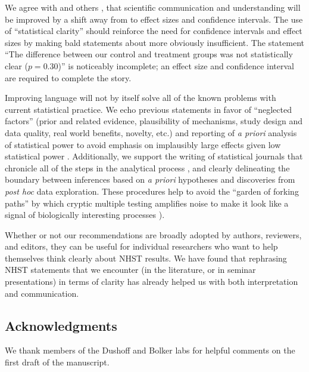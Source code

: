 We agree with \citet{Cohen1994} and others \citep{Goodman1999, ZiliakandMcCloskey2008, WassersteinandLazar2016}, that scientific communication and understanding will be improved by a shift away from \pvals to effect sizes and confidence intervals. The use of ``statistical clarity'' should reinforce the need for confidence intervals and effect sizes by making bald statements about \pvals more obviously insufficient. The statement ``The difference between our control and treatment groups was not statistically clear ($p = 0.30$)'' is noticeably incomplete; an effect size and confidence interval are required to complete the story.

Improving language will not by itself solve all of the known problems with current statistical practice. We echo previous statements in favor of ``neglected factors'' (prior and related evidence, plausibility of mechanisms, study design and data quality, real world benefits, novelty, etc.) \citep{McShaneetal.2017} and reporting of \emph{a priori} analysis of statistical power to avoid emphasis on implausibly large effects given low statistical power \citep[the ``winner's curse''][]{GelmanandCarlin2014, SzucsandIoannidis2017, Bernardietal.2017}. Additionally, we support the writing of statistical journals that chronicle all of the steps in the analytical process \citep{Kassetal.2016}, and clearly delineating the boundary between inferences based on \emph{a priori} hypotheses and discoveries from \emph{post hoc} data exploration. These procedures help to avoid the ``garden of forking paths'' by which cryptic multiple testing amplifies noise to make it look like a signal of biologically interesting processes \citep{gelman_statistical_2014}). 

Whether or not our recommendations are broadly adopted by authors, reviewers, and editors, they can be useful for individual researchers who want to help themselves think clearly about NHST results. We have found that rephrasing NHST statements that we encounter (in the literature, or in seminar presentations) in terms of clarity has already helped us with both interpretation and communication.

\subsection*{Acknowledgments}

\noindent We thank members of the Dushoff and Bolker labs for helpful comments on the first draft of the manuscript.

